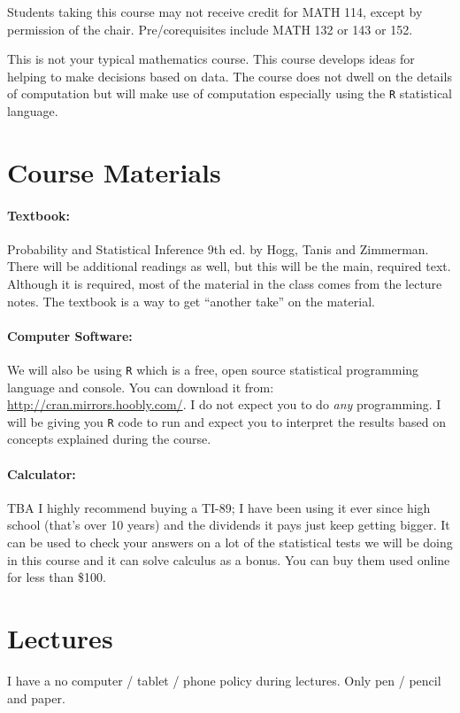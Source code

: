 \documentclass[12pt]{article}
\begin{document}
Students taking this course may not receive credit for MATH 114, except by permission of the chair. Pre/corequisites include MATH 132 or 143 or 152.

This is not your typical mathematics course. This course develops ideas for helping to make decisions based on data. The course does not dwell on the details of computation but will make use of computation especially using the \texttt{R} statistical language.


\section*{Course Materials}

\paragraph{Textbook:} Probability and Statistical Inference 9th ed. by Hogg, Tanis and Zimmerman. There will be additional readings as well, but this will be the main, required text. Although it is required, most of the material in the class comes from the lecture notes. The textbook is a way to get ``another take'' on the material.
\paragraph{Computer Software:} We will also be using \texttt{R} which is a free, open source statistical programming language and console. You can download it from: \url{http://cran.mirrors.hoobly.com/}. I do not expect you to do \textit{any} programming. I will be giving you \texttt{R} code to run and expect you to interpret the results based on concepts explained during the course.
\paragraph{Calculator:} TBA I highly recommend buying a TI-89; I have been using it ever since high school (that's over 10 years) and the dividends it pays just keep getting bigger. It can be used to check your answers on a lot of the statistical tests we will be doing in this course and it can solve calculus as a bonus. You can buy them used online for less than \$100.

\section*{Lectures}

I have a no computer / tablet / phone policy during lectures. Only pen / pencil and paper.
\end{document}
